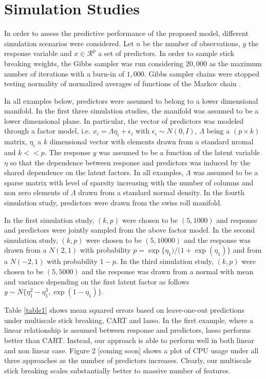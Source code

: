 \documentclass{article}
\begin{document}
\section{Simulation Studies}


In order to assess the predictive performance of the proposed model, different simulation scenarios were considered. Let $n$ be the number of observations, $y$ the response variable and $x \in \mathcal{R}^p$ a set of predictors. In order to sample stick breaking weights, the Gibbs sampler was run considering $20,000$ as the maximum number of iterations with a burn-in of $1,000$. Gibbs sampler chains were stopped testing normality of normalized averages of functions of the Markov chain \cite{Chauveau98anautomated}. 

In all examples below, predictors were assumed to belong to a lower dimensional manifold. In the first three simulation studies, the manifold was assumed to be a lower dimensional plane. In particular, the vector of predictors was modeled through a factor model, i.e. $x_i=\Lambda \eta_i + \epsilon_i$ with $\epsilon_i \sim N(0,I)$, $\Lambda$ being a $(p \times k)$ matrix, $\eta_i$ a $k$ dimensional vector with elements drawn from a standard nromal and $k<<p$. The response $y$ was assumed to be a function of the latent variable $\eta$ so that  the dependence between response and predictors was induced by the shared dependence on the latent factors.  In all examples, $\Lambda$ was assumed to be a sparse matrix with level of sparsity increasing with the number of columns and non zero elements of $\Lambda$ drawn from a standard normal density. In the fourth simulation study, predictors were drawn from the swiss roll manifold.

In the first simulation study, $(k,p)$ were chosen to be $(5,1000)$ and response and predictors were jointly sampled from the above factor model.  In the second simulation study, $(k,p)$ were chosen to be $(5,10000)$ and the response was drawn from a $N(2,1)$ with probability $p=\exp\{\eta_1)/(1+\exp(\eta_1)\}$ and from a $N(-2,1)$ with probability $1-p$.  In the third simulation study, $(k,p)$ were chosen to be $(5,5000)$ and the response was drawn from a normal with mean and variance depending on the first latent factor as follows $y \sim N\{\eta_1^2-\eta_1^3, \exp(1-\eta_1)\}$.

Table \ref{table1} shows mean squared errors based on leave-one-out predictions under multiscale stick breaking, CART and lasso. In the first example, where a linear relationship is assumed between response and predictors, lasso performs better than CART. Instead, our approach is able to perform well in both linear and non linear case.  Figure 2 [coming soon] shows a plot of CPU usage under all three approaches as the number of predictors increases. Clearly, our multiscale stick breaking scales substantially better to massive number of features. 
\end{document}
